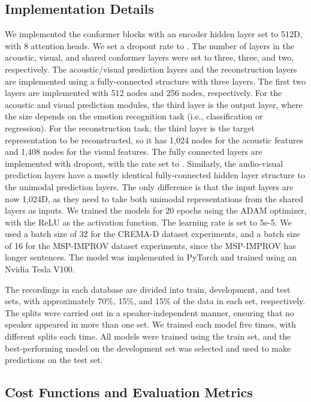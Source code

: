 \documentclass{article}
\begin{document}
\subsection{Implementation Details}
\label{ssec:implementation}

We implemented the conformer blocks with an encoder hidden layer set to 512D, with 8 attention heads. We set a dropout rate to . The number of layers in the acoustic, visual, and shared conformer layers were set to three, three, and two, respectively. The acoustic/visual prediction layers and the reconstruction layers are implemented using a fully-connected structure with three layers. The first two layers are implemented with 512 nodes and 256 nodes, respectively. For the acoustic and visual prediction modules, the third layer is the output layer, where the size depends on the emotion recognition task (i.e., classification or regression). For the reconstruction task, the third layer is the target representation to be reconstructed, so it has 1,024 nodes for the acoustic features and 1,408 nodes for the visual features. The fully connected layers are implemented with dropout, with the rate set to . Similarly, the audio-visual prediction layers have a mostly identical fully-connected hidden layer structure to the unimodal prediction layers. The only difference is that the input layers are now 1,024D, as they need to take both unimodal representations from the shared layers as inputs. We trained the models for 20 epochs using the ADAM optimizer, with the ReLU as the activation function. The learning rate is set to 5e-5. We used a batch size of 32 for the CREMA-D dataset experiments, and a batch size of 16 for the MSP-IMPROV dataset experiments, since the MSP-IMPROV has longer sentences. The model was implemented in PyTorch and trained using an Nvidia Tesla V100.


The recordings in each database are divided into train, development, and test sets, with approximately 70\%, 15\%, and 15\% of the data in each set, respectively. The splits were carried out in a speaker-independent manner, ensuring that no speaker appeared in more than one set. We trained each model five times, with different splits each time. All models were trained using the train set, and the best-performing model on the development set was selected and used to make predictions on the test set.




\subsection{Cost Functions and Evaluation Metrics}
\label{ssec:metrics}
\end{document}
